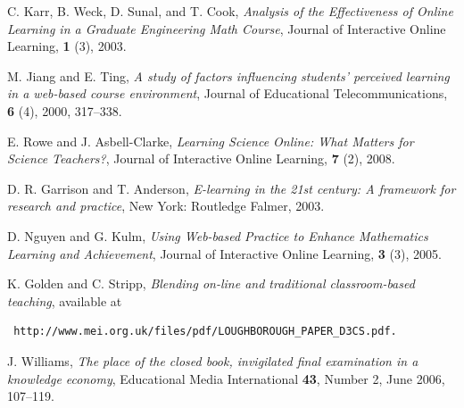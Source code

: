 \documentclass{amsart}
\begin{document}
\begin{thebibliography}{12345}


 C. Karr, B. Weck, D. Sunal, and T. Cook, \emph{Analysis of the Effectiveness of Online 	 Learning in a Graduate Engineering Math Course}, Journal of Interactive Online 	Learning, \textbf{1} (3), 2003.

 M. Jiang and E. Ting, \emph{A study of factors influencing students' perceived learning in a 	 web-based course environment}, Journal of Educational Telecommunications, \textbf{6} (4), 2000,	317--338.

 E. Rowe and J. Asbell-Clarke, \emph{Learning Science Online: What Matters for Science 	Teachers?}, Journal of Interactive Online Learning, \textbf{7} (2), 2008.

 D. R. Garrison and T. Anderson, \emph{E-learning in the 21st century: A framework for 	research and practice}, New York: Routledge Falmer, 2003.

 D. Nguyen and G. Kulm, \emph{Using Web-based Practice to Enhance Mathematics 	Learning and Achievement}, Journal of Interactive Online Learning, \textbf{3} (3), 2005.

 K. Golden and C. Stripp, \emph{Blending on-line and traditional classroom-based teaching}, available at \begin{verbatim} http://www.mei.org.uk/files/pdf/LOUGHBOROUGH_PAPER_D3CS.pdf. \end{verbatim}

 J. Williams, \emph{The place of the closed book, invigilated final examination in a knowledge economy}, Educational Media International \textbf{43}, Number 2, June 2006, 107--119.

\end{thebibliography}
\end{document}
